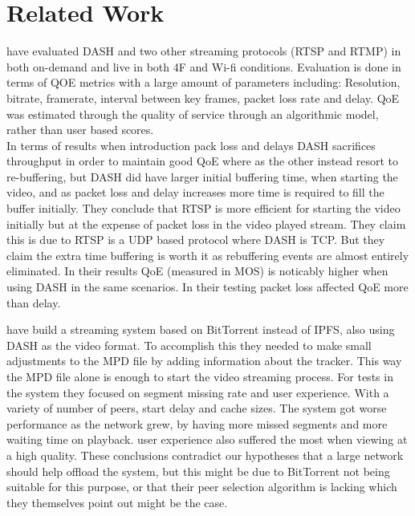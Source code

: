 \chapter{Related Work}
\label{cha:related-work}
\citeauthor{aloman2015performance} \cite{aloman2015performance} have evaluated \acs{DASH} and two other streaming protocols (RTSP and RTMP) in both on-demand and live in both 4F and Wi-fi conditions. Evaluation is done in terms of \ac{QOE} metrics with a large amount of parameters including: Resolution, bitrate, framerate, interval between key frames, packet loss rate and delay. QoE was estimated through the quality of service through an algorithmic model, rather than user based scores.\\
In terms of results when introduction pack loss and delays DASH sacrifices throughput in order to maintain good QoE where as the other instead resort to re-buffering, but DASH did have larger initial buffering time, when starting the video, and as packet loss and delay increases more time is required to fill the buffer initially. They conclude that RTSP is more efficient for starting the video initially but at the expense of packet loss in the video played stream. They claim this is due to RTSP is a UDP based protocol where DASH is TCP. But they claim the extra time buffering is worth it as rebuffering events are almost entirely eliminated. In their results QoE (measured in MOS) is noticably higher when using DASH in the same scenarios. In their testing packet loss affected QoE more than delay.




\citeauthor{gazdar2017toward} \cite{gazdar2017toward} have build a streaming system based on BitTorrent instead of \acs{IPFS}, also using \acs{DASH} as the video format. To accomplish this they needed to make small adjustments to the \acs{MPD} file by adding information about the tracker. This way the \acs{MPD} file alone is enough to start the video streaming process. For tests in the system they focused on segment missing rate and user experience. With a variety of number of peers, start delay and cache sizes. The system got worse performance as the network grew, by having more missed segments and more waiting time on playback. user experience also suffered the most when viewing at a high quality. These conclusions contradict our hypotheses that a large network should help offload the system, but this might be due to BitTorrent not being suitable for this purpose, or that their peer selection algorithm is lacking which they themselves point out might be the case.


